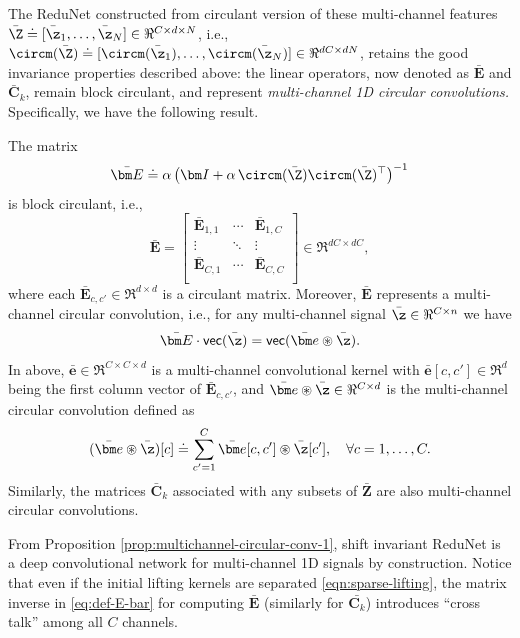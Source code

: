 \documentclass[../../book-main.tex]{subfiles}
\begin{document}
The ReduNet constructed from circulant version of these multi-channel features $\bar\Z \doteq [\bar \z_1, \ldots, \bar \z_N] \in \Re^{C \times d \times N}$, i.e., $\circm(\bar\Z) \doteq [ \circm(\bar\z_1), \dots, \circm(\bar\z_N)] \in \Re^{dC \times dN}$, retains the good invariance properties described above: the linear operators, now denoted as $\bar{\bm E}$ and $\bar{\bm C}_k$, remain block circulant, and represent {\em multi-channel 1D circular convolutions. }
Specifically, we have the following result.
\begin{proposition}
The matrix 
\begin{equation}
\label{eq:def-E-bar}
\bar{\bm E} \doteq \alpha\left(\bm I + \alpha\, \circm(\bar\Z) \circm(\bar\Z)^\top \right) ^{-1}  
\end{equation}
is block circulant, i.e.,
\begin{equation*}
    \bar{\bm E} = 
    \left[\begin{matrix}
        \bar{\bm E}_{1, 1} & \cdots & \bar{\bm E}_{1, C}\\
        \vdots & \ddots & \vdots \\
        \bar{\bm E}_{C, 1} & \cdots & \bar{\bm E}_{C, C}\\
    \end{matrix}\right] \in \Re^{dC \times dC},
\end{equation*}
where each $\bar{\bm E}_{c, c'}\in \Re^{d \times d}$ is a circulant matrix. Moreover, $\bar{\bm E}$ represents a multi-channel circular convolution, i.e., for any multi-channel signal $\bar\z \in \Re^{C \times n}$ we have 
$$\bar{\bm E} \cdot \textsf{vec}(\bar\z) = \textsf{vec}( \bar{\bm e} \circledast \bar\z).$$ 
In above, $\bar{\bm e} \in \Re^{C \times C \times d}$ is a multi-channel convolutional kernel with $\bar{\bm e}[c, c'] \in \Re^{d}$ being the first column vector of $\bar{\bm E}_{c, c'}$, and $\bar{\bm e} \circledast \bar\z \in \Re^{C \times d}$ is the multi-channel circular convolution defined as
\begin{equation*}
    (\bar{\bm e} \circledast \bar\z)[c] \doteq \sum_{c'=1}^C \bar{\bm e}[c, c'] \circledast \bar{\z}[c'], \quad \forall c = 1, \ldots, C.
\end{equation*}
Similarly, the matrices $\bar{\bm C}_k$ associated with any subsets of $\bar{\bm Z}$ are also multi-channel circular convolutions. 
\label{prop:multichannel-circular-conv-1}
\end{proposition}
From Proposition \ref{prop:multichannel-circular-conv-1}, shift invariant ReduNet is a deep convolutional network for multi-channel 1D signals by construction. Notice that even if the initial lifting kernels are separated \eqref{eqn:sparse-lifting}, the matrix inverse  in \eqref{eq:def-E-bar} for computing $\bar{\bm E}$ (similarly for $\bar{\bm C_k}$) introduces ``cross talk'' among all $C$ channels. %
\end{document}
